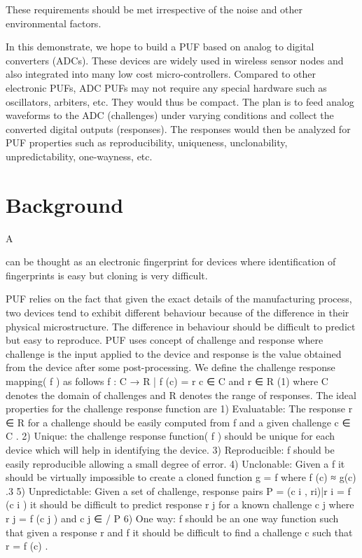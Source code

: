 These requirements should be met 
irrespective of the noise and other environmental factors. 




In this demonstrate, we hope to build a PUF based on analog to digital
converters (ADCs). These devices are widely used in wireless sensor nodes
and also integrated into many low cost micro-controllers.
Compared to other electronic PUFs, ADC PUFs may not require any 
special hardware such as oscillators, arbiters, etc. They would thus
be compact. The plan is to feed analog waveforms to the ADC (challenges) 
under varying conditions and collect the converted digital outputs 
(responses). The responses would then be analyzed for PUF properties 
such as reproducibility, uniqueness, unclonability, unpredictability, 
one-wayness, etc.


%
%

\section{Background}
A 

can be thought as an electronic fingerprint for devices where identification of fingerprints is easy but cloning is very
difficult. 

PUF relies on the fact that given the exact details of the manufacturing process, two devices tend to exhibit
different behaviour because of the difference in their physical microstructure. The difference in behaviour should
be difficult to predict but easy to reproduce. PUF uses concept of challenge and response where challenge is the
input applied to the device and response is the value obtained from the device after some post-processing. We
define the challenge response mapping( f ) as follows
f : C → R | f (c) = r c ∈ C and r ∈ R
(1)
where C denotes the domain of challenges and R denotes the range of responses.
The ideal properties for the challenge response function are
1) Evaluatable: The response r ∈ R for a challenge should be easily computed from f and a given challenge
c ∈ C .
2) Unique: the challenge response function( f ) should be unique for each device which will help in identifying
the device.
3) Reproducible: f should be easily reproducible allowing a small degree of error.
4) Unclonable: Given a f it should be virtually impossible to create a cloned function g = f where f (c) ≈ g(c) .3
5) Unpredictable: Given a set of challenge, response pairs P = {(c i , ri)|r i = f (c i )} it should be difficult to
predict response r j for a known challenge c j where r j = f (c j ) and c j ∈
/ P
6) One way: f should be an one way function such that given a response r and f it should be difficult to find
a challenge c such that r = f (c) .


